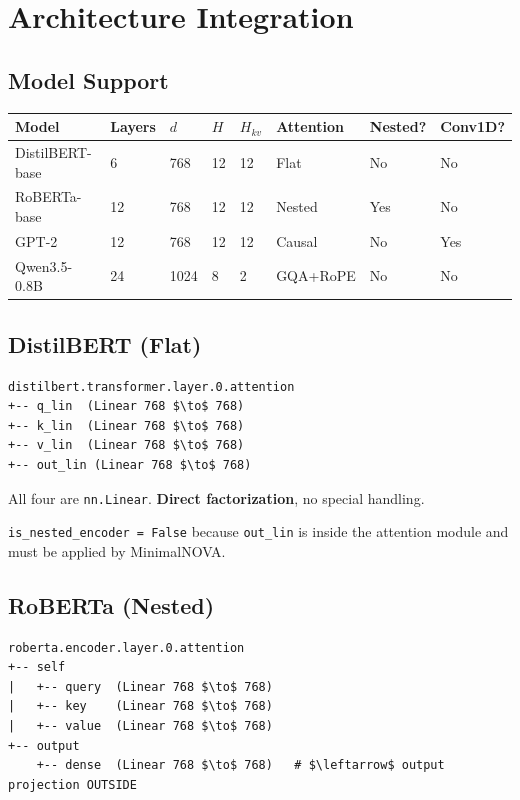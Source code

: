 
\section{Architecture Integration}

\subsection{Model Support}

\begin{table}[H]
\centering
\small
\begin{tabular}{llllllll}
\toprule
\textbf{Model} & \textbf{Layers} & \textbf{$d$} & \textbf{$H$} & \textbf{$H_{kv}$} & \textbf{Attention} & \textbf{Nested?} & \textbf{Conv1D?} \\
\midrule
DistilBERT-base & 6 & 768 & 12 & 12 & Flat & No & No \\
RoBERTa-base & 12 & 768 & 12 & 12 & Nested & Yes & No \\
GPT-2 & 12 & 768 & 12 & 12 & Causal & No & Yes \\
Qwen3.5-0.8B & 24 & 1024 & 8 & 2 & GQA+RoPE & No & No \\
\bottomrule
\end{tabular}
\end{table}

\subsection{DistilBERT (Flat)}

\begin{lstlisting}
distilbert.transformer.layer.0.attention
+-- q_lin  (Linear 768 $\to$ 768)
+-- k_lin  (Linear 768 $\to$ 768)
+-- v_lin  (Linear 768 $\to$ 768)
+-- out_lin (Linear 768 $\to$ 768)
\end{lstlisting}

All four are \texttt{nn.Linear}. \textbf{Direct factorization}, no special handling.

\texttt{is\_nested\_encoder = False} because \texttt{out\_lin} is inside the attention 
module and must be applied by MinimalNOVA.

\subsection{RoBERTa (Nested)}

\begin{lstlisting}
roberta.encoder.layer.0.attention
+-- self
|   +-- query  (Linear 768 $\to$ 768)
|   +-- key    (Linear 768 $\to$ 768)
|   +-- value  (Linear 768 $\to$ 768)
+-- output
    +-- dense  (Linear 768 $\to$ 768)   # $\leftarrow$ output projection OUTSIDE
\end{lstlisting}

